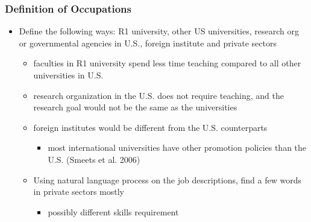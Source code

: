 \documentclass[11pt]{beamer}
\begin{document}
\begin{frame}[label=Occupation]
	\frametitle{Definition of Occupations}
	\begin{itemize}
		\item Define the following ways: R1 university, other US universities, research org or governmental agencies in U.S., foreign institute and private sectors
		\begin{itemize}
			\item faculties in R1 university spend less time teaching compared to all other universities in U.S.  \hyperlink{teaching}{}
			\item research organization in the U.S. does not require teaching, and the research goal would not be the same as the universities
			\item foreign institutes would be different from the U.S. counterparts
			\begin{itemize}
				\item most international universities have other promotion policies than the U.S. (Smeets et al. 2006)
			\end{itemize}
			\item Using natural language process on the job descriptions, find a few words in private sectors mostly  \hyperlink{NLP}{}
				\begin{itemize}
					\item possibly different skills requirement
				\end{itemize}
		\end{itemize}
	\end{itemize}
\end{frame}
\end{document}
